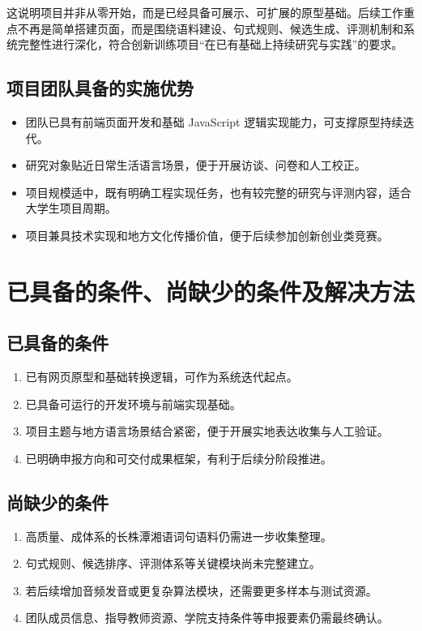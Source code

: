 \documentclass[12pt,a4paper]{ctexart}
\begin{document}
这说明项目并非从零开始，而是已经具备可展示、可扩展的原型基础。后续工作重点不再是简单搭建页面，而是围绕语料建设、句式规则、候选生成、评测机制和系统完整性进行深化，符合创新训练项目“在已有基础上持续研究与实践”的要求。

\subsection{项目团队具备的实施优势}

\begin{itemize}
  \item 团队已具有前端页面开发和基础 JavaScript 逻辑实现能力，可支撑原型持续迭代。
  \item 研究对象贴近日常生活语言场景，便于开展访谈、问卷和人工校正。
  \item 项目规模适中，既有明确工程实现任务，也有较完整的研究与评测内容，适合大学生项目周期。
  \item 项目兼具技术实现和地方文化传播价值，便于后续参加创新创业类竞赛。
\end{itemize}

\section{已具备的条件、尚缺少的条件及解决方法}

\subsection{已具备的条件}

\begin{enumerate}
  \item 已有网页原型和基础转换逻辑，可作为系统迭代起点。
  \item 已具备可运行的开发环境与前端实现基础。
  \item 项目主题与地方语言场景结合紧密，便于开展实地表达收集与人工验证。
  \item 已明确申报方向和可交付成果框架，有利于后续分阶段推进。
\end{enumerate}

\subsection{尚缺少的条件}

\begin{enumerate}
  \item 高质量、成体系的长株潭湘语词句语料仍需进一步收集整理。
  \item 句式规则、候选排序、评测体系等关键模块尚未完整建立。
  \item 若后续增加音频发音或更复杂算法模块，还需要更多样本与测试资源。
  \item 团队成员信息、指导教师资源、学院支持条件等申报要素仍需最终确认。
\end{enumerate}
\end{document}
